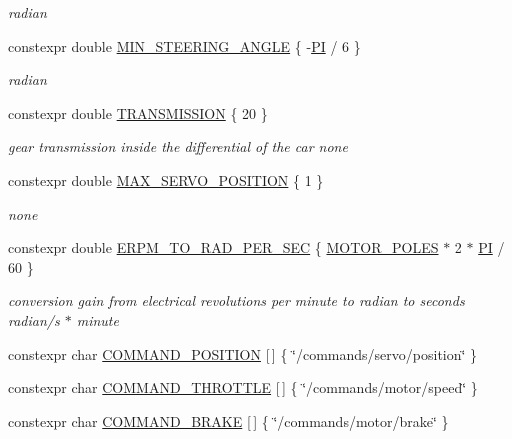 \begin{DoxyCompactItemize}
\begin{DoxyCompactList}\small\item\em radian \end{DoxyCompactList}\item 
constexpr double \hyperlink{namespacecar__config_a38229ce5d2e17e0c30b86864fb20d9ce}{M\+I\+N\+\_\+\+S\+T\+E\+E\+R\+I\+N\+G\+\_\+\+A\+N\+G\+LE} \{ -\/\hyperlink{namespacecar__config_a90cb9957197db8924811c447bc98703a}{PI} / 6 \}
\begin{DoxyCompactList}\small\item\em radian \end{DoxyCompactList}\item 
constexpr double \hyperlink{namespacecar__config_a7af97a6c9168673aba8917029cfe44d3}{T\+R\+A\+N\+S\+M\+I\+S\+S\+I\+ON} \{ 20 \}
\begin{DoxyCompactList}\small\item\em gear transmission inside the differential of the car  none \end{DoxyCompactList}\item 
constexpr double \hyperlink{namespacecar__config_af1712762f3ad9f8805ba474d5f3e7274}{M\+A\+X\+\_\+\+S\+E\+R\+V\+O\+\_\+\+P\+O\+S\+I\+T\+I\+ON} \{ 1 \}
\begin{DoxyCompactList}\small\item\em none \end{DoxyCompactList}\item 
constexpr double \hyperlink{namespacecar__config_a877c4a772a47f4737d9f03fe8a22e106}{E\+R\+P\+M\+\_\+\+T\+O\+\_\+\+R\+A\+D\+\_\+\+P\+E\+R\+\_\+\+S\+EC} \{ \hyperlink{namespacecar__config_a611a0f02cf52db1d438a2dd53b642cd5}{M\+O\+T\+O\+R\+\_\+\+P\+O\+L\+ES} $\ast$ 2 $\ast$ \hyperlink{namespacecar__config_a90cb9957197db8924811c447bc98703a}{PI} / 60 \}
\begin{DoxyCompactList}\small\item\em conversion gain from electrical revolutions per minute to radian to seconds  radian/s $\ast$ minute \end{DoxyCompactList}\item 
constexpr char \hyperlink{namespacecar__config_a6008524bf1090f0ab0c994b2f80dcb22}{C\+O\+M\+M\+A\+N\+D\+\_\+\+P\+O\+S\+I\+T\+I\+ON} \mbox{[}$\,$\mbox{]} \{ \char`\"{}/commands/servo/position\char`\"{} \}
\item 
constexpr char \hyperlink{namespacecar__config_afdb192c52a9126c0bedf2ca4a7c99c2a}{C\+O\+M\+M\+A\+N\+D\+\_\+\+T\+H\+R\+O\+T\+T\+LE} \mbox{[}$\,$\mbox{]} \{ \char`\"{}/commands/motor/speed\char`\"{} \}
\item 
constexpr char \hyperlink{namespacecar__config_ab3b957004ca9df19d509c984937723f7}{C\+O\+M\+M\+A\+N\+D\+\_\+\+B\+R\+A\+KE} \mbox{[}$\,$\mbox{]} \{ \char`\"{}/commands/motor/brake\char`\"{} \}
\end{DoxyCompactItemize}


